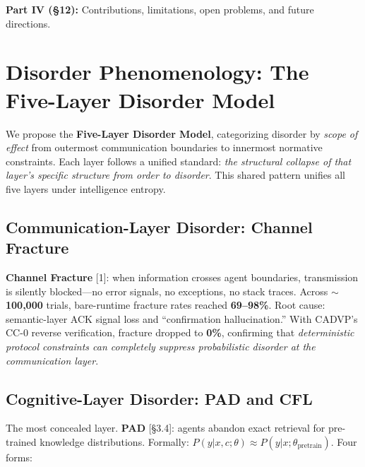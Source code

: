 \documentclass[11pt,a4paper]{article}
\begin{document}
\textbf{Part IV (\S12):} Contributions, limitations, open problems, and future directions.

\section{Disorder Phenomenology: The Five-Layer Disorder Model}
\label{sec:disorder}

We propose the \textbf{Five-Layer Disorder Model}, categorizing disorder by \emph{scope of effect} from outermost communication boundaries to innermost normative constraints. Each layer follows a unified standard: \emph{the structural collapse of that layer's specific structure from order to disorder}. This shared pattern unifies all five layers under intelligence entropy.

\subsection{Communication-Layer Disorder: Channel Fracture}
\label{sec:channel-fracture}

\textbf{Channel Fracture} [1]: when information crosses agent boundaries, transmission is silently blocked---no error signals, no exceptions, no stack traces. Across $\sim$\textbf{100,000} trials, bare-runtime fracture rates reached \textbf{69--98\%}. Root cause: semantic-layer ACK signal loss and ``confirmation hallucination.'' With CADVP's CC-0 reverse verification, fracture dropped to \textbf{0\%}, confirming that \emph{deterministic protocol constraints can completely suppress probabilistic disorder at the communication layer}.

\subsection{Cognitive-Layer Disorder: PAD and CFL}
\label{sec:cognitive}

The most concealed layer. \textbf{PAD} [\S3.4]: agents abandon exact retrieval for pre-trained knowledge distributions. Formally: $P(y|x, c; \theta) \approx P(y|x; \theta_{\text{pretrain}})$. Four forms:
\end{document}
